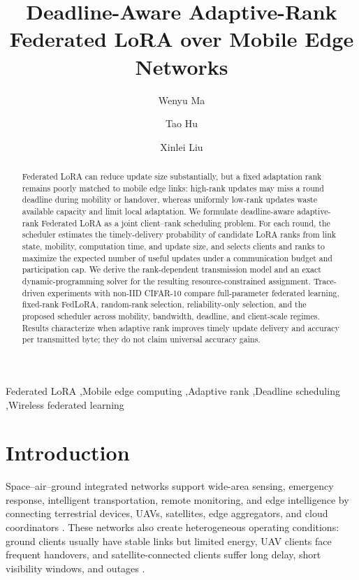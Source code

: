 \documentclass[preprint,12pt]{elsarticle}
\title{Deadline-Aware Adaptive-Rank Federated LoRA over Mobile Edge Networks}
\author[inst1,inst2,inst3]{Wenyu Ma}
\author[inst1,inst2,inst3]{Tao Hu\corref{cor1}}
\author[inst1,inst2,inst3]{Xinlei Liu}
\begin{document}
\begin{frontmatter}
\begin{abstract}
	Federated LoRA can reduce update size substantially, but a fixed adaptation rank remains poorly matched to mobile edge links: high-rank updates may miss a round deadline during mobility or handover, whereas uniformly low-rank updates waste available capacity and limit local adaptation. We formulate deadline-aware adaptive-rank Federated LoRA as a joint client--rank scheduling problem. For each round, the scheduler estimates the timely-delivery probability of candidate LoRA ranks from link state, mobility, computation time, and update size, and selects clients and ranks to maximize the expected number of useful updates under a communication budget and participation cap. We derive the rank-dependent transmission model and an exact dynamic-programming solver for the resulting resource-constrained assignment. Trace-driven experiments with non-IID CIFAR-10 compare full-parameter federated learning, fixed-rank FedLoRA, random-rank selection, reliability-only selection, and the proposed scheduler across mobility, bandwidth, deadline, and client-scale regimes. Results characterize when adaptive rank improves timely update delivery and accuracy per transmitted byte; they do not claim universal accuracy gains.
\end{abstract}


\begin{keyword}
Federated LoRA \sep Mobile edge computing \sep Adaptive rank \sep Deadline scheduling \sep Wireless federated learning
\end{keyword}

\end{frontmatter}


\section{Introduction}

Space--air--ground integrated networks support wide-area sensing, emergency response, intelligent transportation, remote monitoring, and edge intelligence by connecting terrestrial devices, UAVs, satellites, edge aggregators, and cloud coordinators \cite{liu2018sagin,mahboob2024ntn,tang2023flsagin}. These networks also create heterogeneous operating conditions: ground clients usually have stable links but limited energy, UAV clients face frequent handovers, and satellite-connected clients suffer long delay, short visibility windows, and outages \cite{mahboob2024ntn,razmi2022ground,qin2024dfrl}.
\end{document}
